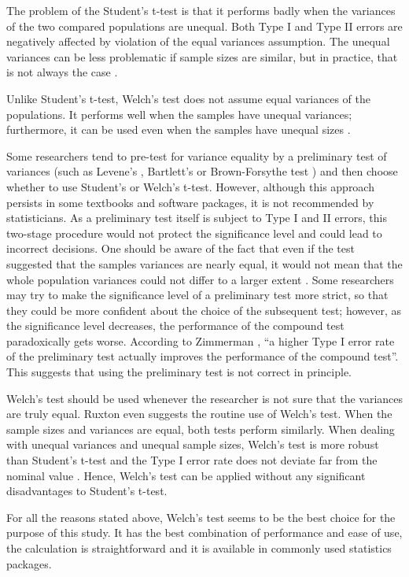 The problem of the Student's t-test is that it performs badly when the variances of the two compared populations are unequal. Both Type I and Type II errors are negatively affected by violation of the equal variances assumption. The unequal variances can be less problematic if sample sizes are similar, but in practice, that is not always the case \cite{ruxton}.

Unlike Student's t-test, Welch's test does not assume equal variances of the populations. It performs well when the samples have unequal variances; furthermore, it can be used even when the samples have unequal sizes \cite{derrick}.

Some researchers tend to pre-test for variance equality by a preliminary test of variances (such as Levene's \cite{levene}, Bartlett's \cite{bartlett} or Brown-Forsythe test \cite{brown}) and then choose whether to use Student's or Welch's t-test. However, although this approach persists in some textbooks and software packages, it is not recommended by statisticians. As a preliminary test itself is subject to Type I and II errors, this two-stage procedure would not protect the significance level and could lead to incorrect decisions. One should be aware of the fact that even if the test suggested that the samples variances are nearly equal, it would not mean that the whole population variances could not differ to a larger extent \cite{zimmerman}. Some researchers may try to make the significance level of a preliminary test more strict, so that they could be more confident about the choice of the subsequent test; however, as the significance level decreases, the performance of the compound test paradoxically gets worse. According to Zimmerman \cite{zimmerman}, ``a higher Type I error rate of the preliminary test actually improves the performance of the compound test''. This suggests that using the preliminary test is not correct in principle.

Welch's test should be used whenever the researcher is not sure that the variances are truly equal. Ruxton \cite{ruxton} even suggests the routine use of Welch's test. When the sample sizes and variances are equal, both tests perform similarly. When dealing with unequal variances and unequal sample sizes, Welch's test is more robust than Student's t-test and the Type I error rate does not deviate far from the nominal value \cite{derrick}. Hence, Welch's test can be applied without any significant disadvantages to Student's t-test.

For all the reasons stated above, Welch's test seems to be the best choice for the purpose of this study. It has the best combination of performance and ease of use, the calculation is straightforward and it is available in commonly used statistics packages.

